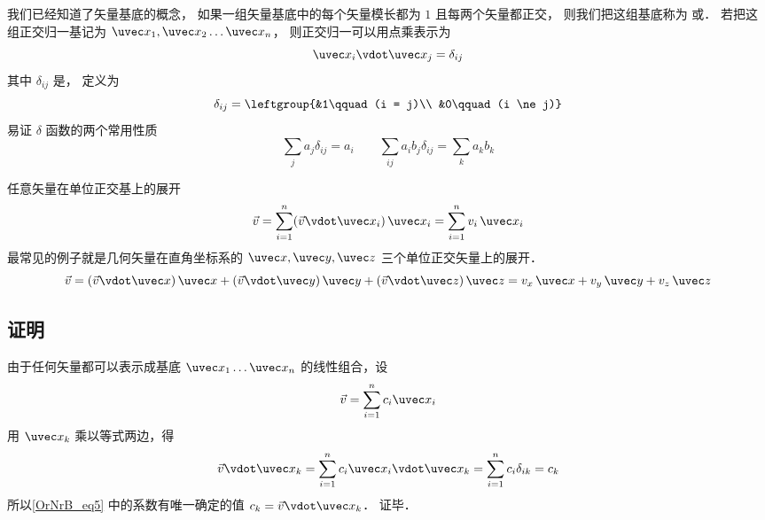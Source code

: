 

我们已经知道了矢量基底的概念， 如果一组矢量基底中的每个矢量模长都为 $1$ 且每两个矢量都正交， 则我们把这组基底称为 或． 若把这组正交归一基记为 $\uvec x_1,\uvec x_2\dots\uvec x_n$， 则正交归一可以用点乘表示为
\begin{equation}
\uvec x_i \vdot \uvec x_j = \delta_{ij}
\end{equation}
其中 $\delta_{ij}$ 是， 定义为
\begin{equation}\label{OrNrB_eq2}
\delta_{ij} = \leftgroup{&1\qquad (i = j)\\ &0\qquad (i \ne j)}
\end{equation}
易证 $\delta$ 函数的两个常用性质
\begin{equation}
\sum_j a_j \delta_{ij} = a_i
\qquad
\sum_{ij} a_i b_j \delta_{ij} = \sum_k a_k b_k
\end{equation}

任意矢量在单位正交基上的展开
 \begin{equation}
\vec v = \sum_{i = 1}^n (\vec v\vdot\uvec x_i)\,\uvec x_i = \sum_{i = 1}^n v_i \,\uvec x_i
\end{equation}
最常见的例子就是几何矢量在直角坐标系的 $\uvec x, \uvec y, \uvec z$ 三个单位正交矢量上的展开．
 \begin{equation}
\vec v = (\vec v \vdot \uvec x)\,\uvec x + (\vec v \vdot \uvec y)\,\uvec y + (\vec v \vdot \uvec z)\,\uvec z = v_x \,\uvec x + v_y \,\uvec y + v_z \,\uvec z
\end{equation} 

\subsection{证明}
由于任何矢量都可以表示成基底 $\uvec x_1 \dots \uvec x_n$ 的线性组合，设
\begin{equation}\label{OrNrB_eq5}
\vec v = \sum_{i = 1}^n c_i \uvec x_i
\end{equation} 
用 $\uvec x_k$ 乘以等式两边，得
\begin{equation}
\vec v \vdot \uvec x_k = \sum_{i = 1}^n  c_i \uvec x_i \vdot\uvec x_k = \sum_{i = 1}^n c_i \delta_{ik}  = c_k
\end{equation}
所以\autoref{OrNrB_eq5} 中的系数有唯一确定的值 $c_k = \vec v \vdot\uvec x_k$． 证毕．
